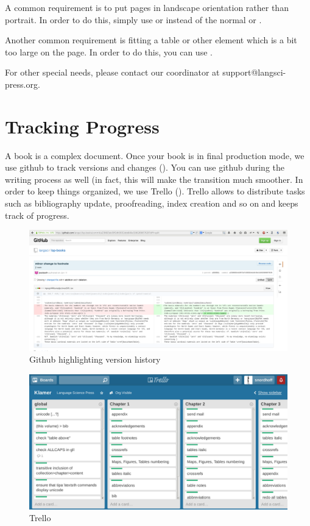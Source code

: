 A common requirement is to put pages in landscape orientation rather than portrait. In order to do this, simply use  or  instead of the normal  or .

Another common requirement is fitting a table or other element which is a bit too large on the page. In order to do this, you can use .

For other special needs, please contact our coordinator at support@langsci-press.org. 

\section{Tracking Progress}
A book is a complex document. Once your book is in final production mode, we use github to track versions and changes (). You can use github during the writing process as well (in fact, this will make the transition much smoother. In order to keep things organized, we use Trello (). Trello allows to distribute tasks such as bibliography update, proofreading, index creation and so on and keeps track of progress.

\begin{figure}
\caption{Github highlighting version history}
\label{fig:latex:github}
 \includegraphics[width=\textwidth]{github.png}
\end{figure}

\begin{figure}
\caption{Trello}
\label{fig:latex:trello}
 \includegraphics[width=\textwidth]{trello.png}
\end{figure}

